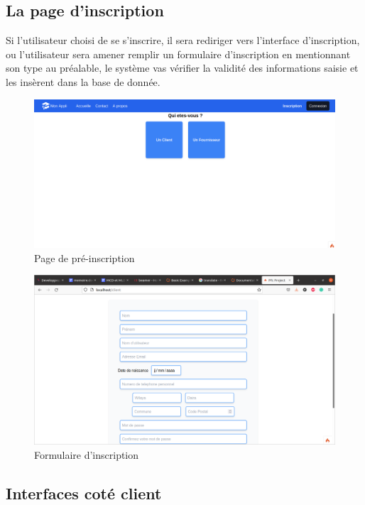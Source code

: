 \documentclass[french]{report}
\begin{document}
\subsection{La page d'inscription}

Si l'utilisateur choisi de se s'inscrire, il sera rediriger vers l'interface
d'inscription, ou l'utilisateur sera amener remplir un formulaire d'inscription
en mentionnant son type au préalable, le système vas vérifier la validité des
informations saisie et les insèrent dans la base de donnée.

\begin{figure}[H]
    \centering
    \includegraphics[width=1\textwidth]{images/inscription.png}
    \caption{Page de pré-inscription}
\end{figure}

\begin{figure}[H]
    \centering
    \includegraphics[width=1\textwidth]{images/formulaire.png}
    \caption{Formulaire d'inscription}
\end{figure}

\subsection{Interfaces coté client}
\end{document}
